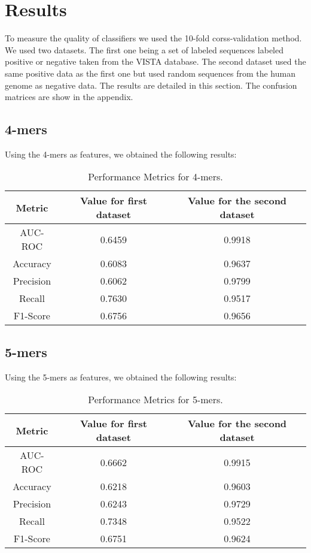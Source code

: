 \section{Results}
To measure the quality of classifiers we used the 10-fold corss-validation method. 
We used two datasets.
The first one being a set of labeled sequences labeled positive or negative taken from the VISTA database.
The second dataset used the same positive data as the first one but used random sequences from the human genome as negative data.
The results are detailed in this section. The confusion matrices are show in the appendix.

\subsection{4-mers}
Using the 4-mers as features, we obtained the following results:
\begin{table}[ht]
\centering
\begin{tabular}{|c|c|c|}
  \hline
  \textbf{Metric} & \textbf{Value for first dataset} & \textbf{Value for the second dataset} \\
  \hline
AUC-ROC   & 0.6459 & 0.9918 \\
Accuracy  & 0.6083 & 0.9637 \\
Precision & 0.6062 & 0.9799 \\
Recall    & 0.7630 & 0.9517 \\
F1-Score  & 0.6756 & 0.9656 \\
  \hline
\end{tabular}
\caption{Performance Metrics for 4-mers.}
\end{table}

\subsection{5-mers}
Using the 5-mers as features, we obtained the following results:
\begin{table}[ht]
\centering
\begin{tabular}{|c|c|c|}
  \hline
  \textbf{Metric} & \textbf{Value for first dataset} & \textbf{Value for the second dataset} \\
  \hline
AUC-ROC   & 0.6662 & 0.9915 \\
Accuracy  & 0.6218 & 0.9603 \\
Precision & 0.6243 & 0.9729 \\
Recall    & 0.7348 & 0.9522 \\
F1-Score  & 0.6751 & 0.9624 \\
  \hline
\end{tabular}
\caption{Performance Metrics for 5-mers.}
\end{table}

